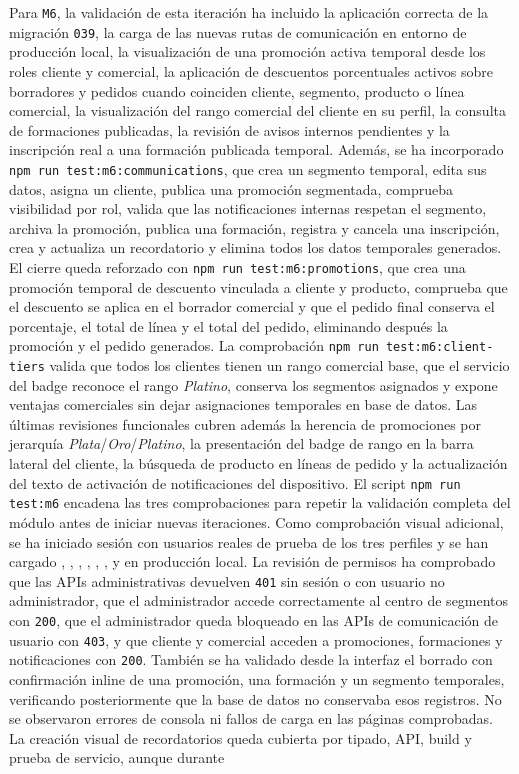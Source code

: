 Para \texttt{M6}, la validación de esta iteración ha incluido la aplicación correcta de la migración \texttt{039}, la carga de las nuevas rutas de comunicación en entorno de producción local, la visualización de una promoción activa temporal desde los roles cliente y comercial, la aplicación de descuentos porcentuales activos sobre borradores y pedidos cuando coinciden cliente, segmento, producto o línea comercial, la visualización del rango comercial del cliente en su perfil, la consulta de formaciones publicadas, la revisión de avisos internos pendientes y la inscripción real a una formación publicada temporal. Además, se ha incorporado \texttt{npm run test:m6:communications}, que crea un segmento temporal, edita sus datos, asigna un cliente, publica una promoción segmentada, comprueba visibilidad por rol, valida que las notificaciones internas respetan el segmento, archiva la promoción, publica una formación, registra y cancela una inscripción, crea y actualiza un recordatorio y elimina todos los datos temporales generados. El cierre queda reforzado con \texttt{npm run test:m6:promotions}, que crea una promoción temporal de descuento vinculada a cliente y producto, comprueba que el descuento se aplica en el borrador comercial y que el pedido final conserva el porcentaje, el total de línea y el total del pedido, eliminando después la promoción y el pedido generados. La comprobación \texttt{npm run test:m6:client-tiers} valida que todos los clientes tienen un rango comercial base, que el servicio del badge reconoce el rango \textit{Platino}, conserva los segmentos asignados y expone ventajas comerciales sin dejar asignaciones temporales en base de datos. Las últimas revisiones funcionales cubren además la herencia de promociones por jerarquía \textit{Plata}/\textit{Oro}/\textit{Platino}, la presentación del badge de rango en la barra lateral del cliente, la búsqueda de producto en líneas de pedido y la actualización del texto de activación de notificaciones del dispositivo. El script \texttt{npm run test:m6} encadena las tres comprobaciones para repetir la validación completa del módulo antes de iniciar nuevas iteraciones. Como comprobación visual adicional, se ha iniciado sesión con usuarios reales de prueba de los tres perfiles y se han cargado , , , , , ,  y  en producción local. La revisión de permisos ha comprobado que las APIs administrativas devuelven \texttt{401} sin sesión o con usuario no administrador, que el administrador accede correctamente al centro de segmentos con \texttt{200}, que el administrador queda bloqueado en las APIs de comunicación de usuario con \texttt{403}, y que cliente y comercial acceden a promociones, formaciones y notificaciones con \texttt{200}. También se ha validado desde la interfaz el borrado con confirmación inline de una promoción, una formación y un segmento temporales, verificando posteriormente que la base de datos no conservaba esos registros. No se observaron errores de consola ni fallos de carga en las páginas comprobadas. La creación visual de recordatorios queda cubierta por tipado, API, build y prueba de servicio, aunque durante 
